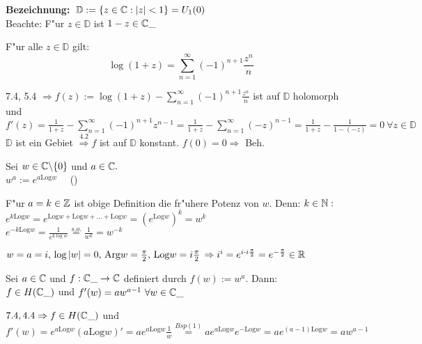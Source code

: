 \documentclass[a4paper,twoside,DIV15,BCOR12mm]{scrbook}
\def\Arg{\text{Arg}}
\def\MdD{\mathbb{D}}
\def\Log{\text{Log}}
\begin{document}
\textbf{Bezeichnung:} $\; \MdD := \{ z \in \MdC : |z| < 1 \} = U_1(0)$ \\
Beachte: F"ur $z \in \MdD$ ist $1-z \in \mathbb{C}\_$

\begin{satz}
F"ur alle $ z \in \MdD$ gilt:
\[
\log (1+z) = \sum_{n=1}^{\infty} (-1)^{n+1} \frac{z^n}{n} 
\]
\end{satz}

\begin{beweis}
7.4, 5.4 $\Rightarrow f(z) := \log(1+z) - \sum_{n=1}^{\infty} (-1)^{n+1} \frac{z^n}{n}$ ist auf $\MdD$ holomorph und \\
$f'(z) = \frac1{1+z} - \sum_{n=1}^{\infty} (-1)^{n+1} z^{n-1} = \frac1{1+z} - \sum_{n=1}^{\infty} (-z)^{n-1} = \frac1{1+z} - \frac1{1-(-z)} = 0 \ \forall z \in \MdD$\\
$\MdD$ ist ein Gebiet $\stackrel{4.2}{\Rightarrow} f$ ist auf $\MdD$ konstant. $f(0) = 0 \Rightarrow$ Beh.
\end{beweis}

\begin{definition}
Sei $w \in \mathbb{C} \backslash \{0\}$ und $a \in \mathbb{C}. $\\
$w^a := e^{a \Log w} \quad $ ()
\end{definition}

\begin{beispiele}
\item F"ur $a= k \in \mathbb{Z}$ ist obige Definition die fr"uhere Potenz von $w$. Denn: $k \in \mathbb{N}:$ \\
$e^{k \Log w} = e^{\Log w + \Log w + \dots + \Log w} = \left(e^{\Log w}\right)^k = w^k$\\
$e^{-k \Log w} = \frac1{e^{k \log w}} \stackrel{s.o.}{=} \frac1{w^k} = w^{-k}$
\item $w=a=i, \, \log|w| = 0, \, \Arg w = \frac{\pi}2, \, \Log w = i \frac{\pi}{2} \, \Rightarrow i^i = e^{i\cdot i \frac{\pi}{2}} = e^{-\frac{\pi}{2}} \in \MdR$
\end{beispiele}

\begin{satz}
Sei $a \in \mathbb{C}$ und $f: \mathbb{C}\_ \rightarrow \mathbb{C}$ definiert durch $f(w) := w^a$. Dann: \\
$f \in H(\mathbb{C}\_)$ und $f'(w) = aw^{a-1} \ \forall w \in \mathbb{C}\_$
\end{satz}

\begin{beweis}
$7.4, 4.4 \Rightarrow f \in H(\mathbb{C}\_)$ und $f'(w) = e^{a \Log w}(a \Log w)' = ae^{a \Log w}\frac1w \stackrel{Bsp(1)}{=} ae^{a \Log w}e^{- \Log w} = ae^{(a-1) \Log w} = aw^{a-1}$
\end{beweis}
\end{document}
